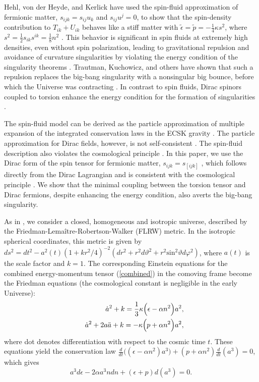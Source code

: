 \documentclass[prd,onecolumn,nofootinbib,showpacs]{revtex4}
\begin{document}
Hehl, von der Heyde, and Kerlick have used the spin-fluid approximation of fermionic matter, $s_{ijk}=s_{ij}u_k$ and $s_{ij}u^j=0$, to show that the spin-density contribution to $T_{ik}+U_{ik}$ behaves like a stiff matter with $\tilde{\epsilon}=\tilde{p}=-\frac{1}{4}\kappa s^2$, where $s^2=\frac{1}{2}s_{ik}s^{ik}=\frac{1}{8}n^2$ \cite{avert,average}.
This behavior is significant in spin fluids at extremely high densities, even without spin polarization, leading to gravitational repulsion and avoidance of curvature singularities by violating the energy condition of the singularity theorems \cite{avert}.
Trautman, Kuchowicz, and others have shown that such a repulsion replaces the big-bang singularity with a nonsingular big bounce, before which the Universe was contracting \cite{reg,Kuch}.
In contrast to spin fluids, Dirac spinors coupled to torsion enhance the energy condition for the formation of singularities \cite{Ker,OC}.

The spin-fluid model can be derived as the particle approximation of multiple expansion of the integrated conservation laws in the ECSK gravity \cite{NSH}.
The particle approximation for Dirac fields, however, is not self-consistent \cite{non}.
The spin-fluid description also violates the cosmological principle \cite{cosmo1}.
In this paper, we use the Dirac form of the spin tensor for fermionic matter, $s_{ijk}=s_{[ijk]}$ \cite{KS,Ker,OC}, which follows directly from the Dirac Lagrangian and is consistent with the cosmological principle \cite{cosmo2}.
We show that the minimal coupling between the torsion tensor and Dirac fermions, despite enhancing the energy condition, also averts the big-bang singularity.

As in \cite{infl}, we consider a closed, homogeneous and isotropic universe, described by the Friedman-Lema\^{i}tre-Robertson-Walker (FLRW) metric.
In the isotropic spherical coordinates, this metric is given by $ds^2=dt^2-a^2(t)(1+kr^2/4)^{-2}(dr^2+r^2 d\vartheta^2+r^2\mbox{sin}^2\vartheta d\varphi^2)$, where $a(t)$ is the scale factor and $k=1$.
The corresponding Einstein equations for the combined energy-momentum tensor (\ref{combined}) in the comoving frame become the Friedman equations (the cosmological constant is negligible in the early Universe):
\begin{eqnarray}
& & {\dot{a}}^2+k=\frac{1}{3}\kappa\Bigl(\epsilon-\alpha n^2\Bigr)a^2, \label{Fri1} \\
& & {\dot{a}}^2+2a\ddot{a}+k=-\kappa\Bigl(p+\alpha n^2\Bigr)a^2,
\label{Fri2}
\end{eqnarray}
where dot denotes differentiation with respect to the cosmic time $t$.
These equations yield the conservation law $\frac{d}{dt}\bigl((\epsilon-\alpha n^2)a^3\bigr)+(p+\alpha n^2)\frac{d}{dt}(a^3)=0$, which gives
\begin{equation}
a^3 d\epsilon-2\alpha a^3 ndn+(\epsilon+p)d(a^3)=0.
\label{law}
\end{equation}
\end{document}
